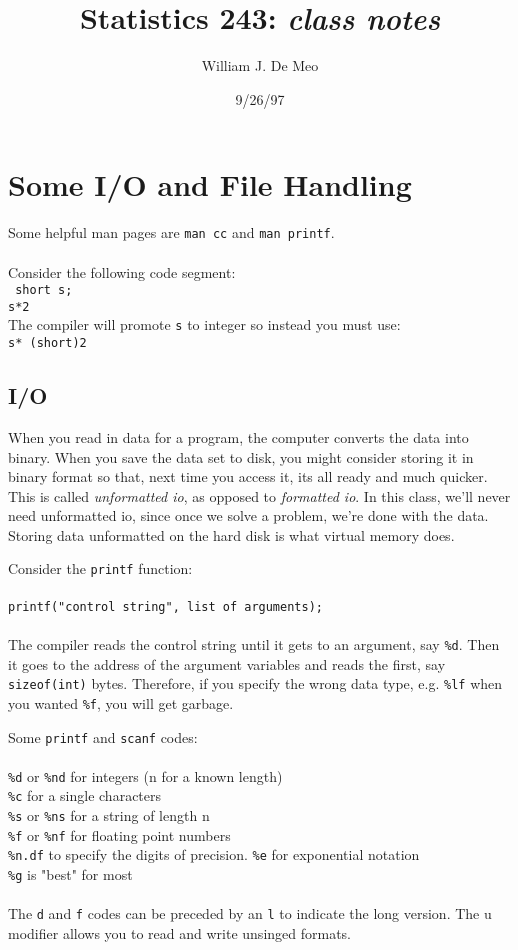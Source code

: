 \documentclass{article}
\begin{document}
\title{Statistics 243: \emph{class notes}}
\author{William J. De Meo}
\date{9/26/97 }
\maketitle
\section{Some I/O and File Handling}
Some helpful man pages are {\tt man cc} and {\tt man printf}.\\
\\
Consider the following code segment:
\\
{\tt
short s;\\
s*2 }
\\
The compiler will promote {\tt s} to integer so instead you must use:
\\
{\tt s* (short)2}

\subsection{I/O}
When you read in data for a program, the computer converts the data into
binary.  When you save the data set to disk, you might consider storing
it in binary format so that, next time you access it, its all ready and
much quicker.  This is called \emph{unformatted io}, as opposed to 
\emph{formatted io}.  In this class, we'll never need unformatted io, since
once we solve a problem, we're done with the data.  Storing data unformatted
on the hard disk is what virtual memory does.

Consider the {\tt printf} function:
\\\\
{\tt printf("control string", list of arguments);}
\\\\
The compiler reads the control string until it gets to an argument,
say {\tt \%d}.  Then
it goes to the address of the argument variables and reads the first,
say {\tt sizeof(int)} bytes.  Therefore, if you specify the wrong data type,
e.g. {\tt \%lf} when you wanted {\tt \%f}, you will get garbage.

Some {\tt printf} and {\tt scanf} codes:
\\\\
{\tt \%d} or {\tt \%nd} for integers (n for a known length)\\
{\tt \%c}  for a single characters\\
{\tt \%s} or {\tt \%ns} for a string of length n\\
{\tt \%f}  or {\tt \%nf} for floating point numbers\\
{\tt \%n.df} to specify the digits of precision.
{\tt \%e} for exponential notation\\
{\tt \%g} is "best" for most\\
\\
The {\tt d} and {\tt f} codes can be preceded by an {\tt l} to indicate the 
long version.  The u modifier allows you to read and write unsinged formats.
\end{document}
